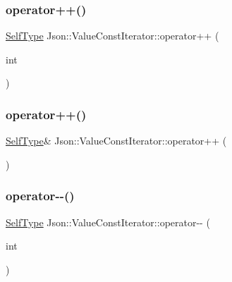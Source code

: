 \subsubsection{\texorpdfstring{operator++()}{operator++()}\hspace{0.1cm}{\footnotesize\ttfamily [1/2]}}
{\footnotesize\ttfamily \hyperlink{classJson_1_1ValueIteratorBase_a9d2a940d03ea06d20d972f41a89149ee_a9d2a940d03ea06d20d972f41a89149ee}{Self\+Type} Json\+::\+Value\+Const\+Iterator\+::operator++ (\begin{DoxyParamCaption}\item[{int}]{ }\end{DoxyParamCaption})\hspace{0.3cm}{\ttfamily [inline]}}

\mbox{\label{classJson_1_1ValueConstIterator_a2cfe2f7a94a688186efdafb1b181c319_a2cfe2f7a94a688186efdafb1b181c319}} 
\subsubsection{\texorpdfstring{operator++()}{operator++()}\hspace{0.1cm}{\footnotesize\ttfamily [2/2]}}
{\footnotesize\ttfamily \hyperlink{classJson_1_1ValueIteratorBase_a9d2a940d03ea06d20d972f41a89149ee_a9d2a940d03ea06d20d972f41a89149ee}{Self\+Type}\& Json\+::\+Value\+Const\+Iterator\+::operator++ (\begin{DoxyParamCaption}{ }\end{DoxyParamCaption})\hspace{0.3cm}{\ttfamily [inline]}}

\mbox{\label{classJson_1_1ValueConstIterator_a94935961e9331c6f7b907b05ec8df75e_a94935961e9331c6f7b907b05ec8df75e}} 
\subsubsection{\texorpdfstring{operator-\/-\/()}{operator--()}\hspace{0.1cm}{\footnotesize\ttfamily [1/2]}}
{\footnotesize\ttfamily \hyperlink{classJson_1_1ValueIteratorBase_a9d2a940d03ea06d20d972f41a89149ee_a9d2a940d03ea06d20d972f41a89149ee}{Self\+Type} Json\+::\+Value\+Const\+Iterator\+::operator-\/-\/ (\begin{DoxyParamCaption}\item[{int}]{ }\end{DoxyParamCaption})\hspace{0.3cm}{\ttfamily [inline]}}

